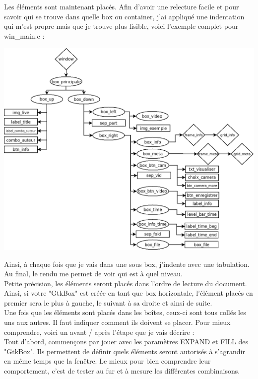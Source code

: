 \documentclass[11pt,french,a4paper]{report}
\begin{document}
Les éléments sont maintenant placés. Afin d'avoir une relecture facile et pour savoir qui se trouve dans quelle box ou container, 
j'ai appliqué une indentation  qui m'est propre mais que je trouve plus lisible, voici l'exemple complet pour win\_main.c : \\

\begin{center}
\includegraphics[scale=0.5]{../images/dia/diagramme_fenetre.png} \\
\end{center}

Ainsi, à chaque fois que je vais dans une sous box, j'indente avec une tabulation. Au final, le rendu me permet de voir qui est
à quel niveau. \\
Petite précision, les éléments seront placés dans l'ordre de lecture du document. Ainsi, si votre "GtkBox" est créée en tant
que box horizontale, l'élément placés en premier sera le plus à gauche, le suivant à sa droite et ainsi de suite. \\ 


Une fois que les éléments sont placés dans les boîtes, ceux-ci sont tous collés les uns aux autres. Il faut indiquer 
comment ils doivent se placer. Pour mieux comprendre, voici un avant / après l'étape que je vais décrire : \\ 


Tout d'abord, commençons par jouer avec les paramètres EXPAND et FILL des "GtkBox". Ils permettent de définir quels éléments seront 
autorisés à s'agrandir en même temps que la fenêtre. Le mieux pour bien comprendre leur comportement, c'est de tester au fur
et à mesure les différentes combinaisons. \\
\end{document}
